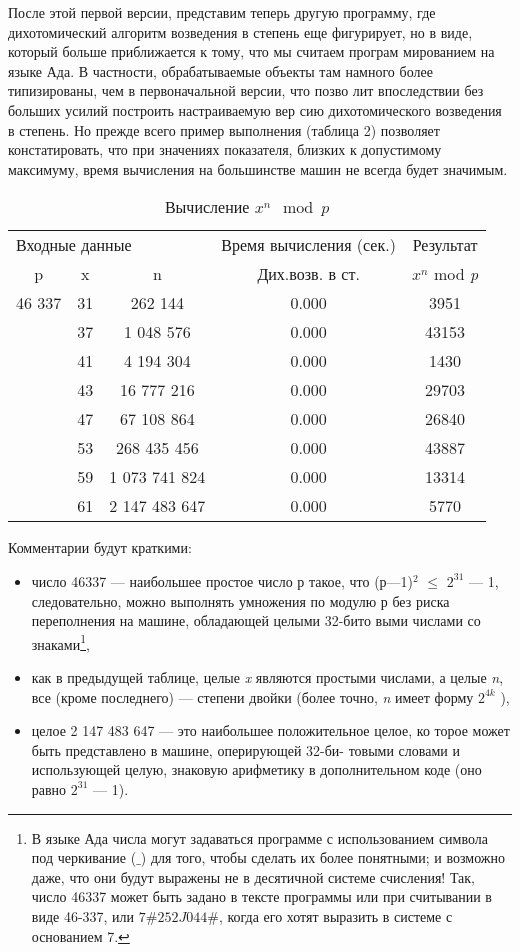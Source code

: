 \noindent После этой первой версии, представим теперь другую программу, где
дихотомический алгоритм возведения в степень еще фигурирует, но в
виде, который больше приближается к тому, что мы считаем програм­
мированием на языке Ада. В частности, обрабатываемые объекты там
намного более типизированы, чем в первоначальной версии, что позво­
лит впоследствии без больших усилий построить настраиваемую вер­
сию дихотомического возведения в степень. Но прежде всего пример
выполнения (таблица 2) позволяет констатировать, что при значениях
показателя, близких к допустимому максимуму, время вычисления на
большинстве машин не всегда будет значимым.
\begin{table}
\centering
\begin{tabular}{|*{5}{c|}}
\hline 
\multicolumn{3}{l}{Входные данные} & {Время вычисления (сек.)} & Результат\\
p & x & n &  Дих.возв. в ст. & $x^n$ mod {\it p}\\ 
\hline
46 337  & 31 & 262 144 & 0.000 & 3951\\
 & 37 & 1 048 576&  0.000 & 43153\\
 & 41 & 4 194 304  & 0.000 & 1430\\
 & 43 & 16 777 216 &  0.000 & 29703\\
 & 47 & 67 108 864  & 0.000 & 26840\\
 & 53 & 268 435 456  & 0.000 & 43887\\
 & 59 & 1 073 741 824 & 0.000 & 13314\\
 & 61 & 2 147 483 647 & 0.000 & 5770\\
\hline
\end{tabular}
\caption{ Вычисление ${x^n}\mod{p}$}
\end{table}

Комментарии будут краткими:
\begin{itemize}
\item число 46337 — наибольшее простое число р такое, что (р—1)$^2$ $\leqslant$
$2^{31}$ — 1, следовательно, можно выполнять умножения по модулю р
без риска переполнения на машине, обладающей целыми 32-бито­
выми числами со знаками\footnote{В языке Ада числа могут задаваться программе с использованием символа под­
черкивание ($\_$) для того, чтобы сделать их более понятными; и возможно даже,
что они будут выражены не в десятичной системе счисления! Так, число 46337
может быть задано в тексте программы или при считывании в виде 46-337, или
$7\# 252J044\#$, когда его хотят выразить в системе с основанием 7.},
\item как в предыдущей таблице, целые {\it x} являются простыми числами,
а целые {\it n}, все (кроме последнего) — степени двойки (более точно,
{\it n} имеет форму $2^{4k}$ ),
\item целое 2 147 483 647 — это наибольшее положительное целое, ко­
торое может быть представлено в машине, оперирующей 32-би-
товыми словами и использующей целую, знаковую арифметику в
дополнительном коде (оно равно $2^{31}$ — 1).
\end{itemize}


